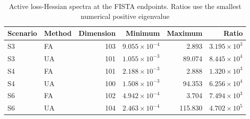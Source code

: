 \begin{table}[htbp]
\centering\small
\caption{Active loss-Hessian spectra at the FISTA endpoints. Ratios use the smallest numerical positive eigenvalue}
\label{tab:geometry-spectrum}
\begin{tabular}{@{}llrrrr@{}}
\toprule
Scenario & Method & Dimension & Minimum & Maximum & Ratio \\
\midrule
S3 & FA & 103 & $9.055\times10^{-4}$ & 2.893 & $3.195\times10^{3}$ \\
S3 & UA & 101 & $1.055\times10^{-3}$ & 89.074 & $8.445\times10^{4}$ \\
S4 & FA & 101 & $2.188\times10^{-3}$ & 2.888 & $1.320\times10^{3}$ \\
S4 & UA & 100 & $1.508\times10^{-3}$ & 94.353 & $6.256\times10^{4}$ \\
S6 & FA & 102 & $4.942\times10^{-4}$ & 3.704 & $7.494\times10^{3}$ \\
S6 & UA & 104 & $2.463\times10^{-4}$ & 115.830 & $4.702\times10^{5}$ \\
\bottomrule
\end{tabular}
\end{table}
